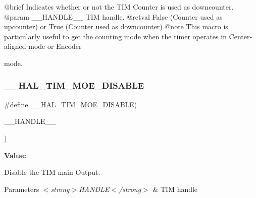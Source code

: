 \begin{DoxyVerb}@brief  Indicates whether or not the TIM Counter is used as downcounter.
@param  __HANDLE__ TIM handle.
@retval False (Counter used as upcounter) or True (Counter used as downcounter)
@note This macro is particularly useful to get the counting mode when the timer operates in Center-aligned mode or Encoder
\end{DoxyVerb}
 mode. \mbox{\label{group___t_i_m___exported___macros_ga69d63e147faeca8909e9679f684c0325}} 
\subsubsection{\texorpdfstring{\_\_HAL\_TIM\_MOE\_DISABLE}{\_\_HAL\_TIM\_MOE\_DISABLE}}
{\footnotesize\ttfamily \#define \+\_\+\+\_\+\+H\+A\+L\+\_\+\+T\+I\+M\+\_\+\+M\+O\+E\+\_\+\+D\+I\+S\+A\+B\+LE(\begin{DoxyParamCaption}\item[{}]{\+\_\+\+\_\+\+H\+A\+N\+D\+L\+E\+\_\+\+\_\+ }\end{DoxyParamCaption})}

{\bfseries Value\+:}
\begin{DoxyCode}{0}
\DoxyCodeLine{\textcolor{keywordflow}{do} \{ \(\backslash\)}
\DoxyCodeLine{                          \{ \(\backslash\)}
\DoxyCodeLine{                            \{ \(\backslash\)}
\DoxyCodeLine{                            \} \(\backslash\)}
\DoxyCodeLine{                            \} \(\backslash\)}

\end{DoxyCode}


Disable the T\+IM main Output. 


\begin{DoxyParams}{Parameters}
{\em $<$strong$>$\+H\+A\+N\+D\+L\+E$<$/strong$>$} & T\+IM handle \\
\hline
\end{DoxyParams}

